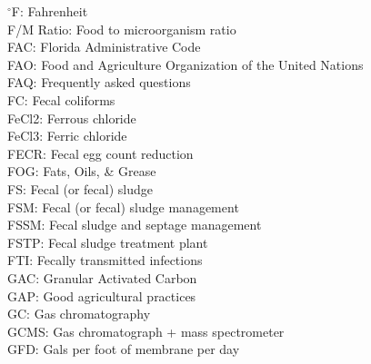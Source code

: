 \documentclass{article}
\begin{document}
$^{\circ}$F:  Fahrenheit
\vspace{0.3cm}\\
F/M Ratio:  Food to microorganism ratio
\vspace{0.3cm}\\
FAC:  Florida Administrative Code
\vspace{0.3cm}\\
FAO:  Food and Agriculture Organization of the United Nations
\vspace{0.3cm}\\
FAQ:  Frequently asked questions
\vspace{0.3cm}\\
FC:  Fecal coliforms
\vspace{0.3cm}\\
FeCl2: Ferrous chloride
\vspace{0.3cm}\\
FeCl3:  Ferric chloride
\vspace{0.3cm}\\
FECR:  Fecal egg count reduction
\vspace{0.3cm}\\
FOG: Fats, Oils, \& Grease
\vspace{0.3cm}\\
FS:  Fecal (or fecal) sludge
\vspace{0.3cm}\\
FSM:  Fecal (or fecal) sludge management
\vspace{0.3cm}\\
FSSM:  Fecal sludge and septage management
\vspace{0.3cm}\\
FSTP:  Fecal sludge treatment plant
\vspace{0.3cm}\\
FTI:  Fecally transmitted infections
\vspace{0.3cm}\\
GAC:  Granular Activated Carbon
\vspace{0.3cm}\\
GAP:  Good agricultural practices
\vspace{0.3cm}\\
GC:  Gas chromatography
\vspace{0.3cm}\\
GCMS:  Gas chromatograph + mass spectrometer
\vspace{0.3cm}\\
GFD:  Gals per foot of membrane per day 
\vspace{0.3cm}\\
\end{document}
